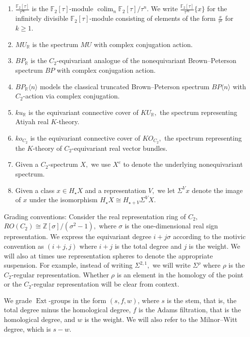 \documentclass{amsart}
\theoremstyle{plain}
\numberwithin{equation}{section}
\numberwithin{figure}{section}
\DeclareMathOperator{\Ext}{Ext}
\DeclareMathOperator*{\colim}{colim}
\newcommand{\mF}{{\mathbb F}}
\newcommand{\mR}{{\mathbb R}}
\newcommand{\mZ}{{\mathbb Z}}
\newcommand{\0}{\langle 0 \rangle }
\begin{document}
\begin{enumerate}
    \item $\frac{\mF_2 [\tau]}{\tau^\infty}$ is the $\mF_2 [\tau]$-module $\colim_n \mF_2 [\tau] / \tau^n.$ 
    We write $\frac{\mF_2 [\tau]}{\tau^\infty} \{x\}$ for the infinitely divisible $\mF_2 [\tau]$-module consisting of elements of the form $\frac{x}{\tau^k}$ for $k\geq 1.$ 
    \item $MU_\mR$ is the spectrum $MU$ with complex conjugation action.
    \item $BP_\mR$ is the $C_2$-equivariant analogue of the nonequivariant Brown--Peterson spectrum $BP$ with complex conjugation action.
    \item $BP_\mR \langle n \rangle$ models the classical truncated Brown–Peterson spectrum $BP \langle n \rangle$ with $C_2$-action via complex conjugation.
    \item $ku_\mR$ is the equivariant connective cover of $KU_\mathbb{R},$ the spectrum representing Atiyah real $K$-theory.
    \item $ko_{C_{2}}$ is the equivariant connective cover of $KO_{C_{2}},$ the spectrum representing the $K$-theory of $C_{2}$-equivariant real vector bundles.
    \item Given a $C_2$-spectrum $X,$ we use $X^e$ to denote the underlying nonequivariant spectrum.
    \item Given a class $x \in H_\star X$ and a representation $V,$ we let $\Sigma^V x$ denote the image of $x$ under the isomorphism $H_{\star}X\cong H_{\star+V}\Sigma^V X$.
 \end{enumerate}

 Grading conventions: Consider the real representation ring of $C_2,$ $RO(C_2) \cong \mZ [\sigma] / (\sigma^2 -1),$ where $\sigma$ is the one-dimensional real sign representation. We express the equivariant degree $i + j\sigma$ according to the motivic convention as $(i + j, j)$ where $i + j$ is the total degree and $j$ is the weight. We will also at times use representation spheres to denote the appropriate suspension. For example, instead of writing $\Sigma^{2,1},$ we will write $\Sigma^\rho$ where $\rho$ is the $C_2$-regular representation. Whether $\rho$ is an element in the homology of the point or the $C_2$-regular representation will be clear from context.  

We grade $\Ext$-groups in the form $(s,f,w)$, where $s$ is the stem, that is, the total degree minus the homological degree, $f$ is the Adams filtration, that is the homological degree, and $w$ is the weight. We will also refer to the Milnor--Witt degree, which is $s-w.$
\end{document}
